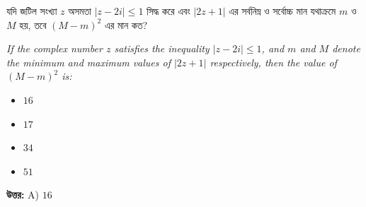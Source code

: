 \documentclass[12pt, a4paper]{article}
\begin{document}
\vspace{1.5em}

\begin{tcolorbox}[questionbox={প্রশ্ন (Question) 7}]
    \noindent
    যদি জটিল সংখ্যা $z$ অসমতা $|z - 2i| \leq 1$ সিদ্ধ করে এবং $|2z + 1|$ এর সর্বনিম্ন ও সর্বোচ্চ মান যথাক্রমে $m$ ও $M$ হয়, তবে $(M - m)^2$ এর মান কত?
    
    \vspace{0.8em}
    \begin{english}
    \noindent\textit{\color{darkgray}
    If the complex number $z$ satisfies the inequality $|z - 2i| \leq 1$, and $m$ and $M$ denote the minimum and maximum values of $|2z + 1|$ respectively, then the value of $(M - m)^2$ is:
    }
    \end{english}
\end{tcolorbox}

\begin{itemize}[label={}, leftmargin=1cm, itemsep=0.5em]
    \item[\textbf{A)}] $16$
    \item[\textbf{B)}] $17$
    \item[\textbf{C)}] $34$
    \item[\textbf{D)}] $51$
\end{itemize}

\vspace{0.5em}
\begin{tcolorbox}[answerbox]
    \textbf{\color{success} উত্তর:} A) $16$
\end{tcolorbox}
\vspace{1em}
\end{document}
